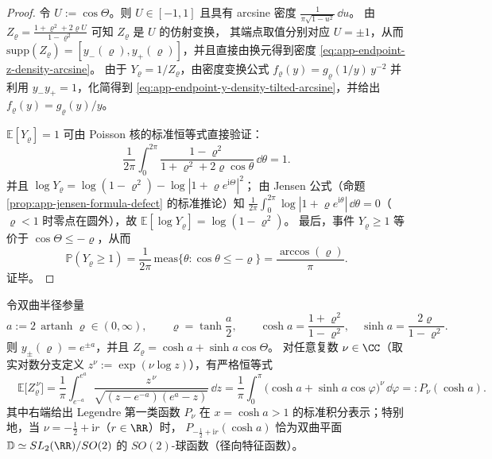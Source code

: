 \begin{proof}
令 \(U:=\cos\Theta\)。则 \(U\in[-1,1]\) 且具有 arcsine 密度
\(
\frac{1}{\pi\sqrt{1-u^{2}}}\,\dd u
\)。
由 \(Z_{\varrho}=\frac{1+\varrho^{2}+2\varrho U}{1-\varrho^{2}}\) 可知 \(Z_{\varrho}\) 是 \(U\) 的仿射变换，
其端点取值分别对应 \(U=\pm 1\)，从而 \(\mathrm{supp}(Z_{\varrho})=[y_{-}(\varrho),y_{+}(\varrho)]\)，并且直接由换元得到密度 \eqref{eq:app-endpoint-z-density-arcsine}。
由于 \(Y_{\varrho}=1/Z_{\varrho}\)，由密度变换公式 \(f_{\varrho}(y)=g_{\varrho}(1/y)\,y^{-2}\) 并利用 \(y_{-}y_{+}=1\)，化简得到 \eqref{eq:app-endpoint-y-density-tilted-arcsine}，并给出 \(f_{\varrho}(y)=g_{\varrho}(y)/y\)。
\par
\(\mathbb{E}[Y_{\varrho}]=1\) 可由 Poisson 核的标准恒等式直接验证：
\[
\frac{1}{2\pi}\int_{0}^{2\pi}\frac{1-\varrho^{2}}{1+\varrho^{2}+2\varrho\cos\theta}\,\dd\theta=1.
\]
并且
\(
\log Y_{\varrho}
=\log(1-\varrho^{2})-\log|1+\varrho e^{\mathrm{i}\Theta}|^{2}
\)；
由 Jensen 公式（命题 \ref{prop:app-jensen-formula-defect} 的标准推论）知
\(
\frac{1}{2\pi}\int_{0}^{2\pi}\log|1+\varrho e^{\mathrm{i}\theta}|\,\dd\theta=0
\)（\(\varrho<1\) 时零点在圆外），故 \(\mathbb{E}[\log Y_{\varrho}]=\log(1-\varrho^{2})\)。
最后，事件 \(Y_{\varrho}\ge 1\) 等价于 \(\cos\Theta\le -\varrho\)，从而
\[
\mathbb{P}(Y_{\varrho}\ge 1)=\frac{1}{2\pi}\,\mathrm{meas}\{\theta:\cos\theta\le-\varrho\}
=\frac{\arccos(\varrho)}{\pi}.
\]
证毕。
\end{proof}

\begin{theorem}\label{thm:app-legendre-moment-timefiber}
令双曲半径参量
\[
a:=2\,\operatorname{artanh}\varrho\in(0,\infty),
\qquad
\varrho=\tanh\frac{a}{2},
\qquad
\cosh a=\frac{1+\varrho^{2}}{1-\varrho^{2}},
\quad
\sinh a=\frac{2\varrho}{1-\varrho^{2}}.
\]
则 \(y_{\pm}(\varrho)=e^{\pm a}\)，并且
\(
Z_{\varrho}=\cosh a+\sinh a\cos\Theta
\)。
对任意复数 \(\nu\in\CC\)（取实对数分支定义 \(z^{\nu}:=\exp(\nu\log z)\)），有严格恒等式
\begin{equation}\label{eq:app-legendre-moment}
\boxed{\quad
\mathbb{E}\bigl[Z_{\varrho}^{\,\nu}\bigr]
=\frac{1}{\pi}\int_{e^{-a}}^{e^{a}}
\frac{z^{\,\nu}}{\sqrt{(z-e^{-a})(e^{a}-z)}}\,\dd z
=\frac{1}{\pi}\int_{0}^{\pi}\bigl(\cosh a+\sinh a\cos\varphi\bigr)^{\nu}\,\dd\varphi
=:P_{\nu}(\cosh a).
\quad}
\end{equation}
其中右端给出 Legendre 第一类函数 \(P_{\nu}\) 在 \(x=\cosh a>1\) 的标准积分表示；特别地，当 \(\nu=-\tfrac12+\mathrm{i}r\)（\(r\in\RR\)）时，
\(
P_{-\frac12+\mathrm{i}r}(\cosh a)
\)
恰为双曲平面 \(\mathbb{D}\simeq SL_{2}(\RR)/SO(2)\) 的 \(SO(2)\)-球函数（径向特征函数）。
\end{theorem}

